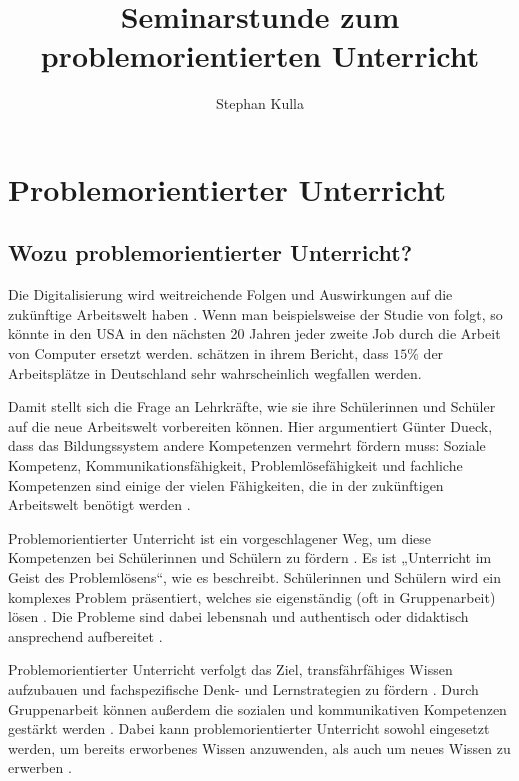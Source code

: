 \documentclass[man,12pt,a4paper]{apa6}
\title{Seminarstunde zum problemorientierten Unterricht}
\author{Stephan Kulla}
\affiliation{TU München}
\begin{document}
\thispagestyle{otherpage}

\maketitle

\section{Problemorientierter Unterricht}

\subsection{Wozu problemorientierter Unterricht?}

Die Digitalisierung wird weitreichende Folgen und Auswirkungen auf die zukünftige Arbeitswelt haben \parencite{dengler2015}. Wenn man beispielsweise der Studie von \textcite{frey2017} folgt, so könnte in den USA in den nächsten 20 Jahren jeder zweite Job durch die Arbeit von Computer ersetzt werden. \textcite{dengler2015} schätzen in ihrem Bericht, dass $15\%$ der Arbeitsplätze in Deutschland sehr wahrscheinlich wegfallen werden.

Damit stellt sich die Frage an Lehrkräfte, wie sie ihre Schülerinnen und Schüler auf die neue Arbeitswelt vorbereiten können. Hier argumentiert Günter Dueck, dass das Bildungssystem andere Kompetenzen vermehrt fördern muss: Soziale Kompetenz, Kommunikationsfähigkeit, Problemlösefähigkeit und fachliche Kompetenzen sind einige der vielen Fähigkeiten, die in der zukünftigen Arbeitswelt benötigt werden \parencite{dueck}.

Problemorientierter Unterricht ist ein vorgeschlagener Weg, um diese Kompetenzen bei Schülerinnen und Schülern zu fördern \parencite{silver2004}. Es ist „Unterricht im Geist des Problemlösens“, wie \textcite{reusser2005} es beschreibt. Schülerinnen und Schülern wird ein komplexes Problem präsentiert, welches sie eigenständig (oft in Gruppenarbeit) lösen \parencite{silver2004}. Die Probleme sind dabei lebensnah und authentisch \parencite{kunter2013} oder didaktisch ansprechend aufbereitet \parencite{reusser2005}.

Problemorientierter Unterricht verfolgt das Ziel, transfährfähiges Wissen aufzubauen und fachspezifische Denk- und Lernstrategien zu fördern \parencite{reusser2005}. Durch Gruppenarbeit können außerdem die sozialen und kommunikativen Kompetenzen gestärkt werden \parencite{seidel2014}. Dabei kann problemorientierter Unterricht sowohl eingesetzt werden, um bereits erworbenes Wissen anzuwenden, als auch um neues Wissen zu erwerben \parencite{reusser2005}.
\end{document}
